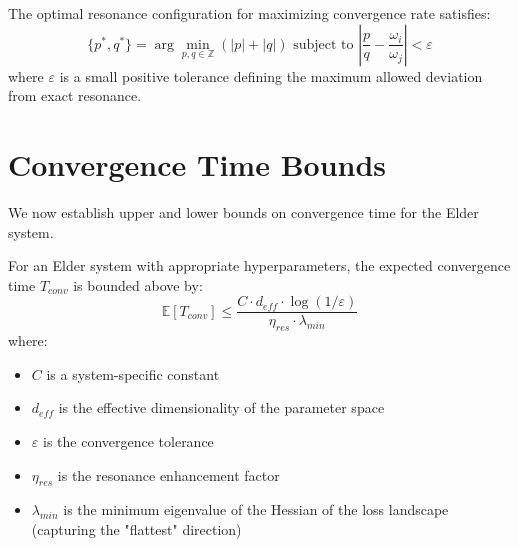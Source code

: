 \begin{corollary}
The optimal resonance configuration for maximizing convergence rate satisfies:
\begin{equation}
\{p^*,q^*\} = \arg\min_{p,q \in \mathbb{Z}} (|p| + |q|) \text{ subject to } \left|\frac{p}{q} - \frac{\omega_i}{\omega_j}\right| < \varepsilon
\end{equation}
where $\varepsilon$ is a small positive tolerance defining the maximum allowed deviation from exact resonance.
\end{corollary}

\section{Convergence Time Bounds}



We now establish upper and lower bounds on convergence time for the Elder system.

\begin{theorem}
For an Elder system with appropriate hyperparameters, the expected convergence time $T_{conv}$ is bounded above by:
\begin{equation}
\mathbb{E}[T_{conv}] \leq \frac{C \cdot d_{eff} \cdot \log(1/\varepsilon)}{\eta_{res} \cdot \lambda_{min}}
\end{equation}
where:
\begin{itemize}
    \item $C$ is a system-specific constant
    \item $d_{eff}$ is the effective dimensionality of the parameter space
    \item $\varepsilon$ is the convergence tolerance
    \item $\eta_{res}$ is the resonance enhancement factor
    \item $\lambda_{min}$ is the minimum eigenvalue of the Hessian of the loss landscape (capturing the "flattest" direction)
\end{itemize}
\end{theorem}


